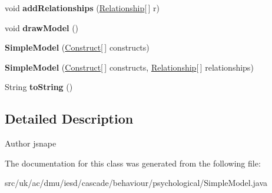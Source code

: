 \begin{DoxyCompactItemize}
\item 
\hypertarget{classuk_1_1ac_1_1dmu_1_1iesd_1_1cascade_1_1behaviour_1_1psychological_1_1_simple_model_a8e51867674986aea08e378eb23b8bbc2}{void {\bfseries add\-Relationships} (\hyperlink{interfaceuk_1_1ac_1_1dmu_1_1iesd_1_1cascade_1_1behaviour_1_1psychological_1_1_relationship}{Relationship}\mbox{[}$\,$\mbox{]} r)}\label{classuk_1_1ac_1_1dmu_1_1iesd_1_1cascade_1_1behaviour_1_1psychological_1_1_simple_model_a8e51867674986aea08e378eb23b8bbc2}

\item 
\hypertarget{classuk_1_1ac_1_1dmu_1_1iesd_1_1cascade_1_1behaviour_1_1psychological_1_1_simple_model_a1ad3895044c48ca6d0c3db4123bebb33}{void {\bfseries draw\-Model} ()}\label{classuk_1_1ac_1_1dmu_1_1iesd_1_1cascade_1_1behaviour_1_1psychological_1_1_simple_model_a1ad3895044c48ca6d0c3db4123bebb33}

\item 
\hypertarget{classuk_1_1ac_1_1dmu_1_1iesd_1_1cascade_1_1behaviour_1_1psychological_1_1_simple_model_a8d72cc76f083ad8d16e3b1cc071c3ac7}{{\bfseries Simple\-Model} (\hyperlink{interfaceuk_1_1ac_1_1dmu_1_1iesd_1_1cascade_1_1behaviour_1_1psychological_1_1_construct}{Construct}\mbox{[}$\,$\mbox{]} constructs)}\label{classuk_1_1ac_1_1dmu_1_1iesd_1_1cascade_1_1behaviour_1_1psychological_1_1_simple_model_a8d72cc76f083ad8d16e3b1cc071c3ac7}

\item 
\hypertarget{classuk_1_1ac_1_1dmu_1_1iesd_1_1cascade_1_1behaviour_1_1psychological_1_1_simple_model_a0002917489a567617396b9ca62c6e32f}{{\bfseries Simple\-Model} (\hyperlink{interfaceuk_1_1ac_1_1dmu_1_1iesd_1_1cascade_1_1behaviour_1_1psychological_1_1_construct}{Construct}\mbox{[}$\,$\mbox{]} constructs, \hyperlink{interfaceuk_1_1ac_1_1dmu_1_1iesd_1_1cascade_1_1behaviour_1_1psychological_1_1_relationship}{Relationship}\mbox{[}$\,$\mbox{]} relationships)}\label{classuk_1_1ac_1_1dmu_1_1iesd_1_1cascade_1_1behaviour_1_1psychological_1_1_simple_model_a0002917489a567617396b9ca62c6e32f}

\item 
\hypertarget{classuk_1_1ac_1_1dmu_1_1iesd_1_1cascade_1_1behaviour_1_1psychological_1_1_simple_model_aeff09f14e24f8896ab17f4f875e910e6}{String {\bfseries to\-String} ()}\label{classuk_1_1ac_1_1dmu_1_1iesd_1_1cascade_1_1behaviour_1_1psychological_1_1_simple_model_aeff09f14e24f8896ab17f4f875e910e6}

\end{DoxyCompactItemize}


\subsection{Detailed Description}
\begin{DoxyAuthor}{Author}
jsnape 
\end{DoxyAuthor}


The documentation for this class was generated from the following file\-:\begin{DoxyCompactItemize}
\item 
src/uk/ac/dmu/iesd/cascade/behaviour/psychological/Simple\-Model.\-java\end{DoxyCompactItemize}
